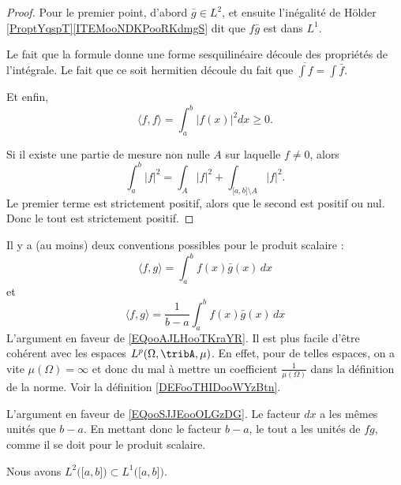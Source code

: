 \begin{proof}
	Pour le premier point, d'abord \( \bar g\in L^2\), et ensuite l'inégalité de Hölder \ref{ProptYqspT}\ref{ITEMooNDKPooRKdmgS} dit que \( f\bar g\) est dans \( L^1\).

	Le fait que la formule donne une forme sesquilinéaire découle des propriétés de l'intégrale. Le fait que ce soit hermitien découle du fait que \( \overline{ \int f }=\int\bar f\).

	Et enfin,
	\begin{equation}
		\langle f,f \rangle =\int_a^b| f(x) |^2dx\geq 0.
	\end{equation}

	Si il existe une partie de mesure non nulle \( A\) sur laquelle \( f\neq 0\), alors
	\begin{equation}
		\int_a^b| f |^2=\int_A| f |^2+\int_{\mathopen[ a , b \mathclose]\setminus A}| f |^2.
	\end{equation}
	Le premier terme est strictement positif, alors que le second est positif ou nul. Donc le tout est strictement positif.
\end{proof}

\begin{normaltext}
	Il y a (au moins) deux conventions possibles pour le produit scalaire :
	\begin{equation}    \label{EQooAJLHooTKraYR}
		\langle f, g\rangle =\int_a^bf(x)\bar g(x)\,dx
	\end{equation}
	et
	\begin{equation}    \label{EQooSJJEooOLGzDG}
		\langle f, g\rangle =\frac{1}{ b-a }\int_a^bf(x)\bar g(x)\,dx
	\end{equation}
	L'argument en faveur de \eqref{EQooAJLHooTKraYR}. Il est plus facile d'être cohérent avec les espaces \( L^p(\Omega, \tribA, \mu)\). En effet, pour de telles espaces, on a vite \( \mu(\Omega)=\infty\) et donc du mal à mettre un coefficient \( \frac{1}{ \mu(\Omega) }\) dans la définition de la norme. Voir la définition \ref{DEFooTHIDooWYzBtn}.

	L'argument en faveur de \eqref{EQooSJJEooOLGzDG}. Le facteur \( dx\) a les mêmes unités que \( b-a\). En mettant donc le facteur \( b-a\), le tout a les unités de \( fg\), comme il se doit pour le produit scalaire.
\end{normaltext}

\begin{proposition}	\label{PROPooSPDIooKntTyz}
	Nous avons \( L^2\big( \mathopen[ a,b\mathclose] \big)\subset L^1\big( \mathopen[ a,b\mathclose] \big)\).
\end{proposition}

